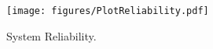 \begin{figure}[htbp]
   \begin{center}    
    \texttt{[image: figures/PlotReliability.pdf]}
    \end{center}
    \caption{System Reliability.}
    \label{fig:PlotRel}
\end{figure}


